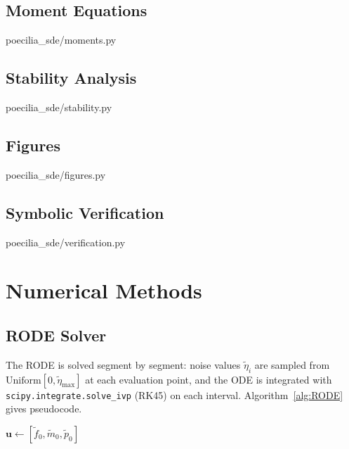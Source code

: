 \documentclass[12pt]{article}
\begin{document}
{\subsection*{Moment Equations}

  {poecilia_sde/moments.py}

\subsection*{Stability Analysis}

  {poecilia_sde/stability.py}

\subsection*{Figures}

  {poecilia_sde/figures.py}

\subsection*{Symbolic Verification}

  {poecilia_sde/verification.py}

}

\section{Numerical Methods}\label{app:numerical}

\subsection{RODE Solver}
The RODE is solved segment by segment: noise values $\tilde{\eta}_i$ are sampled from $\mathrm{Uniform}[0, \tilde{\eta}_{\max}]$ at each evaluation point, and the ODE is integrated with \texttt{scipy.integrate.solve\_ivp} (RK45) on each interval.  Algorithm~\ref{alg:RODE} gives pseudocode.

\begin{algorithm}[H]
\DontPrintSemicolon
\SetAlgoLined
{}
$\mathbf{u} \leftarrow [\tilde{f}_0, \tilde{m}_0, \tilde{p}_0]$\;
\caption{RODE solver (piecewise-constant noise + RK45)}
\label{alg:RODE}
\end{algorithm}
\end{document}
